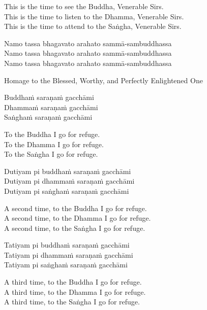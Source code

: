 \begin{english}
  This is the time to see the Buddha, Venerable Sirs.\\
  This is the time to listen to the Dhamma, Venerable Sirs.\\
  This is the time to attend to the Saṅgha, Venerable Sirs.
\end{english}

\suttaRef{[Thai]}

Namo tassa bhagavato arahato sammā-sambuddhassa\\
Namo tassa bhagavato arahato sammā-sambuddhassa\\
Namo tassa bhagavato arahato sammā-sambuddhassa

\begin{english}
  Homage to the Blessed, Worthy, and Perfectly Enlightened One
\end{english}

Buddhaṁ saraṇaṁ gacchāmi\\
Dhammaṁ saraṇaṁ gacchāmi\\
Saṅghaṁ saraṇaṁ gacchāmi

\begin{english}
  To the Buddha I go for refuge.\\
  To the Dhamma I go for refuge.\\
  To the Saṅgha I go for refuge.
\end{english}

Dutiyam pi buddhaṁ saraṇaṁ gacchāmi\\
Dutiyam pi dhammaṁ saraṇaṁ gacchāmi\\
Dutiyam pi saṅghaṁ saraṇaṁ gacchāmi

\begin{english}
  A second time, to the Buddha I go for refuge.\\
  A second time, to the Dhamma I go for refuge.\\
  A second time, to the Saṅgha I go for refuge.
\end{english}

Tatiyam pi buddhaṁ saraṇaṁ gacchāmi\\
Tatiyam pi dhammaṁ saraṇaṁ gacchāmi\\
Tatiyam pi saṅghaṁ saraṇaṁ gacchāmi

\begin{english}
  A third time, to the Buddha I go for refuge.\\
  A third time, to the Dhamma I go for refuge.\\
  A third time, to the Saṅgha I go for refuge.
\end{english}

